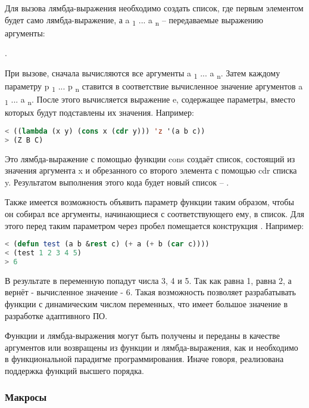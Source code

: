 Для вызова лямбда-выражения необходимо создать список, где первым элементом будет само лямбда-выражение, а a \textsubscript 1 ... a \textsubscript n -- передаваемые выражению аргументы: 

.

При вызове, сначала вычисляются все аргументы a \textsubscript 1 ... a \textsubscript n. Затем каждому параметру p \textsubscript 1 ... p \textsubscript n ставится в соответствие вычисленное значение аргументов a \textsubscript 1 ... a \textsubscript n. После этого вычисляется выражение e, содержащее параметры, вместо которых будут подставлены их значения. Например:

\begin{lstlisting}[language=Lisp, frame=none]
< ((lambda (x y) (cons x (cdr y))) 'z '(a b c))
> (Z B C)
\end{lstlisting}

Это лямбда-выражение с помощью функции cons создаёт список, состоящий из значения аргумента x и обрезанного со второго элемента с помощью cdr списка y. Результатом выполнения этого кода будет новый список -- .

Также имеется возможность объявить параметр функции таким образом, чтобы он собирал все аргументы, начинающиеся с соответствующего ему, в список. Для этого перед таким параметром через пробел помещается конструкция . Например:

\begin{lstlisting}[language=Lisp, frame=none]
< (defun test (a b &rest c) (+ a (+ b (car c))))
< (test 1 2 3 4 5)
> 6
\end{lstlisting}

В результате в переменную  попадут числа 3, 4 и 5. Так как  равна 1,  равна 2, а  вернёт  - вычисленное значение - 6. Такая возможность позволяет разрабатывать функции с динамическим числом переменных, что имеет большое значение в разработке адаптивного ПО.

Функции и лямбда-выражения могут быть получены и переданы в качестве аргументов или возвращены из функции и лямбда-выражения, как и необходимо в функциональной парадигме программирования. Иначе говоря, реализована поддержка функций высшего порядка.

\subsubsection{Макросы}

